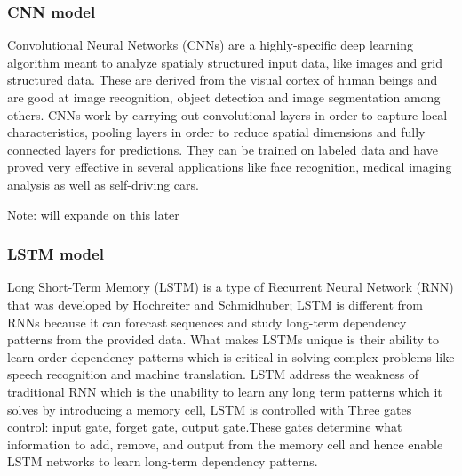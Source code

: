 


\subsubsection{CNN model}
Convolutional Neural Networks (CNNs) are a highly-specific deep learning algorithm meant to analyze spatialy structured input data, like images and grid structured data. These are derived from the visual cortex of human beings and are good at image recognition, object detection and image segmentation among others. CNNs work by carrying out convolutional layers in order to capture local characteristics, pooling layers in order to reduce spatial dimensions and fully connected layers for predictions. They can be trained on labeled data and have proved very effective in several applications like face recognition, medical imaging analysis as well as self-driving cars.\cite{CNN}

Note: will expande on this later











\subsubsection{LSTM model}
Long Short-Term Memory (LSTM) is a type of Recurrent Neural Network (RNN) that was developed by Hochreiter and Schmidhuber; LSTM is different from RNNs because it can forecast sequences and study long-term dependency patterns from the provided data. What makes LSTMs unique is their ability to learn order dependency patterns which is critical in solving complex problems like speech recognition and machine translation.
LSTM address the weakness of traditional RNN which is the unability to learn any long term patterns which it solves by introducing a memory cell, LSTM is controlled with Three gates control: input gate, forget gate, output gate.These gates determine what information to add, remove, and output from the memory cell and hence enable LSTM networks to learn long-term dependency patterns. \cite{lstm}

